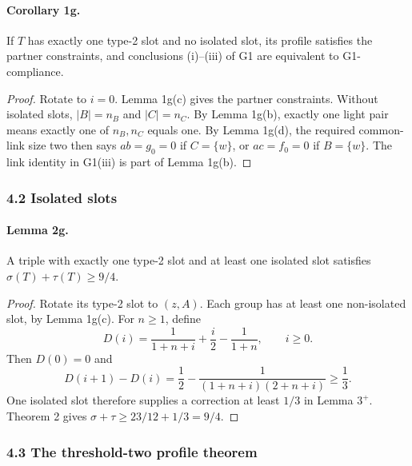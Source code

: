 \paragraph{Corollary 1g.} If $T$ has exactly one type-2 slot and no isolated slot, its profile satisfies the partner constraints, and conclusions (i)--(iii) of G1 are equivalent to G1-compliance.
\begin{proof}
Rotate to $i=0$. Lemma 1g(c) gives the partner constraints. Without isolated slots, $|B|=n_B$ and $|C|=n_C$. By Lemma 1g(b), exactly one light pair means exactly one of $n_B,n_C$ equals one. By Lemma 1g(d), the required common-link size two then says $ab=g_0=0$ if $C=\{w\}$, or $ac=f_0=0$ if $B=\{w\}$. The link identity in G1(iii) is part of Lemma 1g(b).
\end{proof}
\subsubsection*{4.2 Isolated slots}
\paragraph{Lemma 2g.} A triple with exactly one type-2 slot and at least one isolated slot satisfies $\sigma(T)+\tau(T)\geq9/4$.
\begin{proof}
Rotate its type-2 slot to $(z,A)$. Each group has at least one non-isolated slot, by Lemma 1g(c). For $n\geq1$, define
\[
 D(i)=\frac1{1+n+i}+\frac i2-\frac1{1+n},\qquad i\geq0.
\]
Then $D(0)=0$ and
\[
 D(i+1)-D(i)=\frac12-\frac1{(1+n+i)(2+n+i)}\geq\frac13.
\]
One isolated slot therefore supplies a correction at least $1/3$ in Lemma $3^+$. Theorem 2 gives $\sigma+\tau\geq23/12+1/3=9/4$.
\end{proof}
\subsubsection*{4.3 The threshold-two profile theorem}
